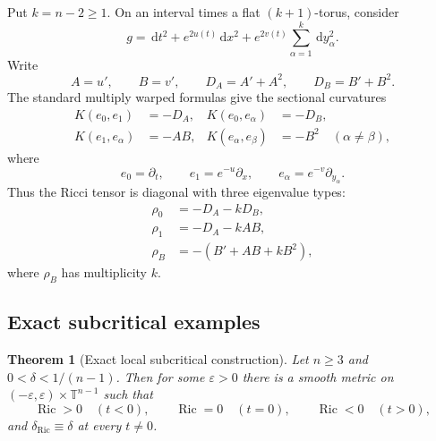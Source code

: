 \documentclass[11pt,reqno]{amsart}
\newtheorem{theorem}{Theorem}[section]
\theoremstyle{definition}
\theoremstyle{remark}
\newcommand{\Ric}{\operatorname{Ric}}
\newcommand{\dd}{\,\mathrm d}
\newcommand{\T}{\mathbb T}
\newcommand{\dric}{\delta_{\mathrm{Ric}}}
\newcommand{\eps}{\varepsilon}
\begin{document}
Put $k=n-2\ge1$.  On an interval times a flat $(k+1)$-torus, consider
\begin{equation}\label{eq:double-warp}
g=\dd t^2+e^{2u(t)}\dd x^2+e^{2v(t)}\sum_{\alpha=1}^k\dd y_\alpha^2.
\end{equation}
Write
\[
A=u',\qquad B=v',\qquad D_A=A'+A^2,\qquad D_B=B'+B^2.
\]
The standard multiply warped formulas \cite{BishopONeill} give the sectional curvatures
\begin{align}
K(e_0,e_1)&=-D_A,&
K(e_0,e_\alpha)&=-D_B,\label{eq:double-sec1}\\
K(e_1,e_\alpha)&=-AB,&
K(e_\alpha,e_\beta)&=-B^2\quad(\alpha\ne\beta),\label{eq:double-sec2}
\end{align}
where
\[
e_0=\partial_t,
\qquad e_1=e^{-u}\partial_x,
\qquad e_\alpha=e^{-v}\partial_{y_\alpha}.
\]
Thus the Ricci tensor is diagonal with three eigenvalue types:
\begin{align}
\rho_0&=-D_A-kD_B,\label{eq:rho0}\\
\rho_1&=-D_A-kAB,\label{eq:rho1}\\
\rho_B&=-(B'+AB+kB^2),\label{eq:rhoB}
\end{align}
where $\rho_B$ has multiplicity $k$.

\subsection{Exact subcritical examples}

\begin{theorem}[Exact local subcritical construction]\label{thm:subcritical-local}
Let $n\ge3$ and $0<\delta<1/(n-1)$.  Then for some $\eps>0$ there is a smooth metric on $(-\eps,\eps)\times\T^{n-1}$ such that
\[
\Ric>0\quad(t<0),
\qquad
\Ric=0\quad(t=0),
\qquad
\Ric<0\quad(t>0),
\]
and $\dric\equiv\delta$ at every $t\ne0$.
\end{theorem}
\end{document}
